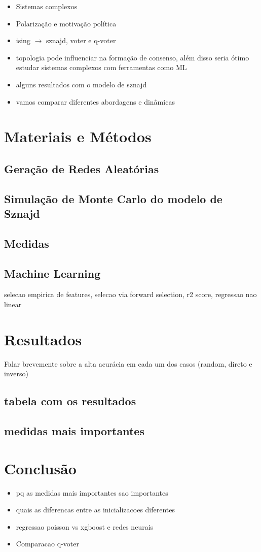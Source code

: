 \documentclass{article}
\begin{document}
\begin{itemize}
    \item Sistemas complexos
    \item Polarização e motivação política
    \item ising $\rightarrow$ sznajd, voter e q-voter
    \item topologia pode influenciar na formação de consenso, além disso seria ótimo estudar sistemas complexos com ferramentas como ML
    \item alguns resultados com o modelo de sznajd
    \item vamos comparar diferentes abordagens e dinâmicas
\end{itemize}

\section{Materiais e Métodos}
\subsection{Geração de Redes Aleatórias}

\subsection{Simulação de Monte Carlo do modelo de Sznajd}
\subsection{Medidas}
\subsection{Machine Learning}
selecao empirica de features, selecao via forward selection, r2 score, regressao nao linear
\section{Resultados}
Falar brevemente sobre a alta acurácia em cada um dos casos (random, direto e inverso)
\subsection{tabela com os resultados}
\subsection{medidas mais importantes}
\section{Conclusão}
\begin{itemize}
    \item{pq as medidas mais importantes sao importantes}
    \item{quais as diferencas entre as inicializacoes diferentes}
    \item{regressao poisson vs xgboost e redes neurais}
    \item{Comparacao q-voter}
\end{itemize}



\end{document}
